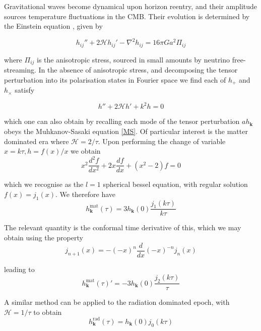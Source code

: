 \documentclass[a4paper,10pt]{article}
\renewcommand{\v}[1]{\mathbf{#1}}
\begin{document}
Gravitational waves become dynamical upon horizon reentry, and their amplitude sources temperature fluctuations in the CMB. Their evolution is determined by the Einstein equation , given by \cite{Pritchard}

\begin{equation}
h_{ij}''+2\mathcal{H}h_{ij}'-\nabla^2h_{ij} = 16\pi Ga^2\Pi_{ij}
\end{equation}

where $\Pi_{ij}$ is the anisotropic stress, sourced in small amounts by neutrino free-streaming. In the absence of anisotropic stress, and decomposing the tensor perturbation into its polarisation states in Fourier space we find each of $h_+$ and $h_\times$ satisfy

\begin{equation}
h''+2\mathcal{H}h'+k^2h = 0
\end{equation}

which one can also obtain by recalling each mode of the tensor perturbation $ah_\v{k}$ obeys the Muhkanov-Sasaki equation \ref{MS}.  Of particular interest is the matter dominated era where $\mathcal{H}=2/\tau$. Upon performing the change of variable $x=k\tau,  h=f(x)/x$ we obtain
\begin{equation}
x^2\frac{d^2f}{dx^2}+2x\frac{df}{dx}+(x^2-2)f=0
\end{equation}

which we recognise as the $l=1$ spherical bessel equation, with regular solution $f(x) = j_1(x)$. We therefore have
\begin{equation}
h^{\text{mat}}_\v{k}(\tau) = 3h_\v{k}(0)\frac{j_1(k\tau)}{k\tau}
\end{equation}

The relevant quantity is the conformal time derivative of this, which we may obtain using the property
\begin{equation}
j_{n+1}(x)=-(-x)^n\frac{d}{dx}(-x)^{-n}j_n(x)
\end{equation}

leading to 
\begin{equation}
h^{\text{mat}}_\v{k}(\tau)' = -3h_\v{k}(0)\frac{j_2(k\tau)}{\tau}
\end{equation}

A similar method can be applied to the radiation dominated epoch, with $\mathcal{H}=1/\tau$ to obtain
\begin{equation}
h^{\text{rad}}_\v{k}(\tau) = h_\v{k}(0)j_0({k\tau})
\end{equation}
\end{document}
